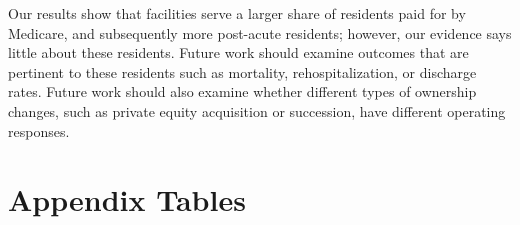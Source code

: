 \documentclass[12pt]{article}
\begin{document}
Our results show that facilities serve a larger share of residents paid for by Medicare, and subsequently more post-acute residents; however, our evidence says little about these residents. Future work should examine outcomes that are pertinent to these residents such as mortality, rehospitalization, or discharge rates. Future work should also examine whether different types of ownership changes, such as private equity acquisition or succession, have different operating responses.

\singlespacing
\setlength\bibsep{0pt}



\clearpage

\onehalfspacing

\section*{Appendix Tables} \label{sec:tab}
\setcounter{table}{0}
\renewcommand{\thetable}{A\arabic{table}}
\end{document}

